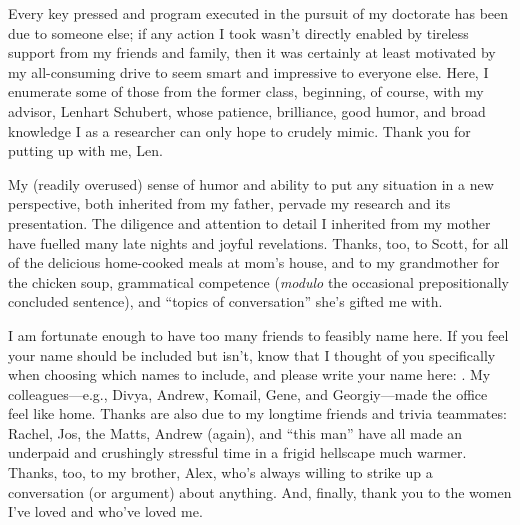 \begin{acknowledgments}


Every key pressed and program executed in the pursuit of my doctorate has been due to someone else; if any action I took wasn't directly enabled by tireless support from my friends and family, then it was certainly at least motivated by my all-consuming drive to seem smart and impressive to everyone else. Here, I enumerate some of those from the former class, beginning, of course, with my advisor, Lenhart Schubert, whose patience, brilliance, good humor, and broad knowledge I as a researcher can only hope to crudely mimic. Thank you for putting up with me, Len.

My (readily overused) sense of humor and ability to put any situation in a new perspective, both inherited from my father, pervade my research and its presentation. The diligence and attention to detail I inherited from my mother have fuelled many late nights and joyful revelations. Thanks, too, to Scott, for all of the delicious home-cooked meals at mom's house, and to my grandmother for the chicken soup, grammatical competence (\textit{modulo} the occasional prepositionally concluded sentence), and ``topics of conversation'' she's gifted me with.

I am fortunate enough to have too many friends to feasibly name here. If you feel your name should be included but isn't, know that I thought of you specifically when choosing which names to include, and please write your name here: \underline{\hspace{50mm}}. My colleagues---e.g., Divya, Andrew, Komail, Gene, and Georgiy---made the office feel like home. Thanks are also due to my longtime friends and trivia teammates: Rachel, Jos, the Matts, Andrew (again), and ``this man'' have all made an underpaid and crushingly stressful time in a frigid hellscape much warmer. Thanks, too, to my brother, Alex, who's always willing to strike up a conversation (or argument) about anything. And, finally, thank you to the women I've loved and who've loved me.

\end{acknowledgments}